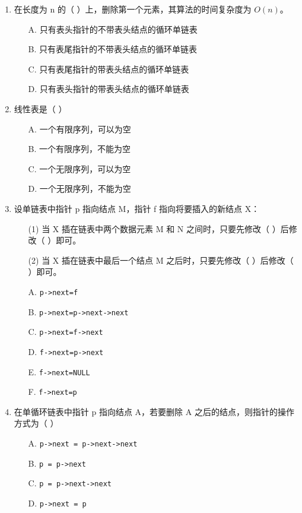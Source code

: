 \documentclass[12pt, a4paper]{article}
\begin{document}
\begin{enumerate}[label=\arabic*.]
	\item 在长度为 n 的（ ）上，删除第一个元素，其算法的时间复杂度为 $O(n)$。
	      \begin{enumerate}
		      \item[A.] 只有表头指针的不带表头结点的循环单链表
		      \item[B.] 只有表尾指针的不带表头结点的循环单链表
		      \item[C.] 只有表尾指针的带表头结点的循环单链表
		      \item[D.] 只有表头指针的带表头结点的循环单链表
	      \end{enumerate}

	\item 线性表是（ ）
	      \begin{enumerate}
		      \item[A.] 一个有限序列，可以为空
		      \item[B.] 一个有限序列，不能为空
		      \item[C.] 一个无限序列，可以为空
		      \item[D.] 一个无限序列，不能为空
	      \end{enumerate}

	\item 设单链表中指针 p 指向结点 M，指针 f 指向将要插入的新结点 X：
	      \begin{enumerate}
		      \item[(1)] 当 X 插在链表中两个数据元素 M 和 N 之间时，只要先修改（ ）后修改（ ）即可。
		      \item[(2)] 当 X 插在链表中最后一个结点 M 之后时，只要先修改（ ）后修改（ ）即可。
		      \item[A.] \texttt{p->next=f}
		      \item[B.] \texttt{p->next=p->next->next}
		      \item[C.] \texttt{p->next=f->next}
		      \item[D.] \texttt{f->next=p->next}
		      \item[E.] \texttt{f->next=NULL}
		      \item[F.] \texttt{f->next=p}
	      \end{enumerate}

	\item 在单循环链表中指针 p 指向结点 A，若要删除 A 之后的结点，则指针的操作方式为（ ）
	      \begin{enumerate}
		      \item[A.] \texttt{p->next = p->next->next}
		      \item[B.] \texttt{p = p->next}
		      \item[C.] \texttt{p = p->next->next}
		      \item[D.] \texttt{p->next = p}
	      \end{enumerate}


\end{enumerate}
\end{document}
